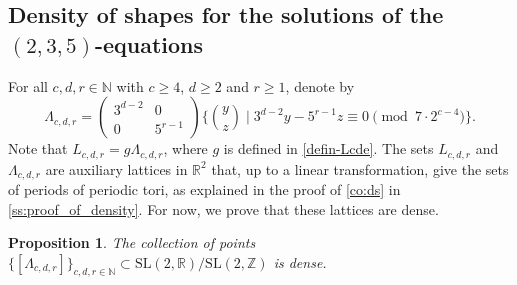 \documentclass[11pt,letterpaper]{amsart}
\newtheorem{prop}[theorem]{Proposition}
\theoremstyle{definition}
\theoremstyle{remark}
\renewcommand{\rm}[1]{\mathrm{#1}}
\newcommand{\bb}[1]{\mathbb{#1}}
\newcommand{\R}{\bb R}
\newcommand{\Z}{\bb Z}
\newcommand{\N}{\bb N}
\newcommand{\SL}{\rm{SL}}
\begin{document}
\subsection{Density of shapes for the solutions of the \texorpdfstring{$(2,3,5)$}{(2,3,5)}-equations}

	For all $c,d,r\in \N$ with $c\geq 4$, $d\geq 2$ and $r \geq 1$, denote by 
	$$\Lambda_{c,d,r} = \begin{pmatrix}
		3^{d-2} & 0\\
		0 &  5^{r-1}
	\end{pmatrix} \bigg\lbrace 
	\binom{y}{z}
	\; \bigg\vert \;
	3^{d-2} y - 5^{r-1} z \equiv 0 \pmod{ 7 \cdot 2^{c-4}}
	\bigg\rbrace.$$
	Note that
	$L_{c,d,r} = g \Lambda_{c,d,r}$, where $g$ is defined in \cref{defin-Lcde}.
 The sets $L_{c,d,r}$ and $\Lambda_{c,d,r}$ are auxiliary lattices in $\R^2$ that, up to a linear transformation, give the sets of periods of periodic tori, as explained in the proof of \cref{co:ds} in \cref{ss:proof_of_density}. 
 For now, we prove that these lattices are dense.
	\begin{prop}\label{theorm_density}
		The collection of points $  \lbrace   [\Lambda_{c,d,r}] \rbrace_{c,d,r\in \N} \subset \SL(2,\R)/\SL(2,\Z)$ is dense.
	\end{prop}
\end{document}

